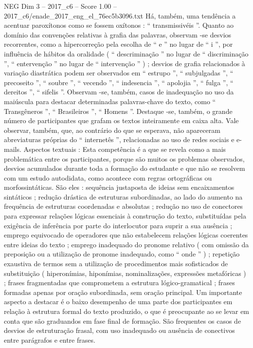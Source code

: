 \begin{textsample}{NEG Dim 3 – 2017\_c6 – Score 1.00 – 2017\_c6/enade\_2017\_eng\_el\_76ec5b3096.txt}
Há, também, uma tendência a acentuar paroxítonos como se fossem oxítonos : “ transmissivéis ”.
Quanto ao domínio das convenções relativas à grafia das palavras, observam -se desvios recorrentes, como a hipercorreção pela escolha de “ e ” no lugar de “ i ”, por influência de hábitos da oralidade ( “ descriminação ” no lugar de “ discriminação ”, “ entervenção ” no lugar de “ intervenção ” ) ; desvios de grafia relacionados à variação diastrática podem ser observados em “ estrupo ”, “ subjulgadas ”, “ precoseito ”, “ soubre ”, “ vecendo ”, “ indesencia ”, “ apolojia ”, “ fulga ”, “ dereitos ”, “ sifelis ”.
Observam -se, também, casos de inadequação no uso da maiúscula para destacar determinadas palavras-chave do texto, como “ Transgêneros ”, “ Brasileiros ”, “ Homens ”.
Destaque -se, também, o grande número de participantes que grafam os textos inteiramente em caixa alta.
Vale observar, também, que, ao contrário do que se esperava, não apareceram abreviaturas próprias do “ internetês ”, relacionadas ao uso de redes sociais e e-mails.
Aspectos textuais : Esta competência é a que se revela como a mais problemática entre os participantes, porque são muitos os problemas observados, desvios acumulados durante toda a formação do estudante e que não se resolvem com um estudo autodidata, como acontece com regras ortográficas ou morfossintáticas.
São eles : sequência justaposta de ideias sem encaixamentos sintáticos ; redução drástica de estruturas subordinadas, ao lado do aumento na frequência de estruturas coordenadas e absolutas ; redução no uso de conectores para expressar relações lógicas essenciais à construção do texto, substituídas pela exigência de inferência por parte do interlocutor para suprir a sua ausência ; emprego equivocado de operadores que não estabelecem relações lógicas coerentes entre ideias do texto ; emprego inadequado do pronome relativo ( com omissão da preposição ou a utilização de pronome inadequado, como “ onde ” ) ; repetição exaustiva de termos sem a utilização de procedimentos mais sofisticados de substituição ( hiperonímias, hiponímias, nominalizações, expressões metafóricas ) ; frases fragmentadas que comprometem a estrutura lógico-gramatical ; frases formadas apenas por oração subordinada, sem oração principal.
Um importante aspecto a destacar é o baixo desempenho de uma parte dos participantes em relação à estrutura formal do texto produzido, o que é preocupante ao se levar em conta que são graduandos em fase final de formação.
São frequentes os casos de desvios de estruturação frasal, com uso inadequado ou ausência de conectivos entre parágrafos e entre frases.

\end{textsample}
